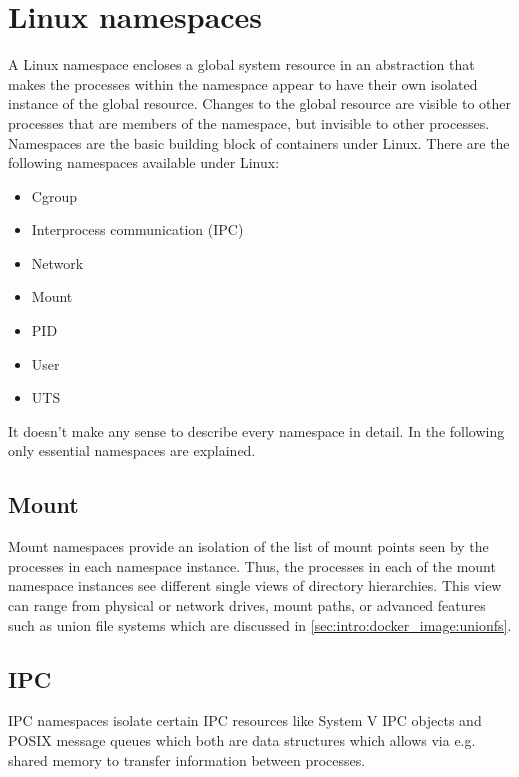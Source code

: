 \section{Linux namespaces}
\label{sec:intro:containerization:linux_namespaces}
A Linux namespace encloses a global system resource in an abstraction that makes the processes within the namespace appear to have their own isolated instance of the global resource. Changes to the global resource are visible to other processes that are members of the namespace, but invisible to other processes. Namespaces are the basic building block of containers under Linux. There are the following namespaces available under Linux:
\begin{itemize}
\item Cgroup
\item Interprocess communication (IPC)
\item Network
\item Mount
\item PID
\item User
\item UTS
\end{itemize}

It doesn't make any sense to describe every namespace in detail. In the following only essential namespaces are explained.

\subsection{Mount}
\label{sec:intro:containerization:linux_namespaces:mount_namespaces}
Mount namespaces provide an isolation of the list of mount points seen by the processes in each namespace instance. Thus, the processes in each of the mount namespace instances see different single views of directory hierarchies. This view can range from physical or network drives, mount paths, or advanced features such as union file systems which are discussed in \ref{sec:intro:docker_image:unionfs}.

\subsection{IPC}
\label{sec:intro:containerization:linux_namespaces:ipc_namespaces}
IPC namespaces isolate certain IPC resources like System V IPC objects and POSIX message queues which both are data structures which allows via e.g. shared memory to transfer information between processes.


